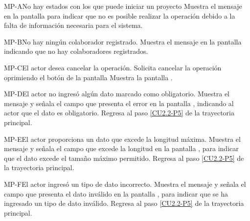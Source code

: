 		\begin{UCtrayectoriaA}{MP-A}{No hay estados con los que puede iniciar un proyecto}
			\UCpaso[\UCsist] Muestra el mensaje  en la pantalla  para indicar que no es posible realizar la operación debido a la falta de información necesaria para el sistema.
		\end{UCtrayectoriaA}


		\begin{UCtrayectoriaA}{MP-B}{No hay ningún colaborador registrado.}
	\UCpaso[\UCsist] Muestra el mensaje  en la pantalla  indicando que no hay colaboradores registrados.
		\end{UCtrayectoriaA}
	
	\begin{UCtrayectoriaA}{MP-C}{El actor desea cancelar la operación.}
		\UCpaso[\UCactor] Solicita cancelar la operación oprimiendo el botón  de la pantalla 
		\UCpaso[\UCsist] Muestra la pantalla .
	\end{UCtrayectoriaA}

	\begin{UCtrayectoriaA}{MP-D}{El actor no ingresó algún dato marcado como obligatorio.}
		\UCpaso[\UCsist] Muestra el mensaje  y señala el campo que presenta el error en la pantalla , indicando al actor que el dato es obligatorio.
		\UCpaso Regresa al paso \ref{CU2.2-P5} de la trayectoria principal.
	\end{UCtrayectoriaA}

	\begin{UCtrayectoriaA}{MP-E}{El actor proporciona un dato que excede la longitud máxima.}
		\UCpaso[\UCsist] Muestra el mensaje  y señala el campo que excede la longitud en la pantalla , para indicar que el dato excede el tamaño máximo permitido.
		\UCpaso Regresa al paso \ref{CU2.2-P5} de la trayectoria principal.
	\end{UCtrayectoriaA}
	
	\begin{UCtrayectoriaA}{MP-F}{El actor ingresó un tipo de dato incorrecto.}
		\UCpaso[\UCsist] Muestra el mensaje  y señala el campo que presenta el dato inválido en la pantalla , para indicar que se ha ingresado un tipo de dato inválido.
		\UCpaso Regresa al paso \ref{CU2.2-P5} de la trayectoria principal.
	\end{UCtrayectoriaA}

